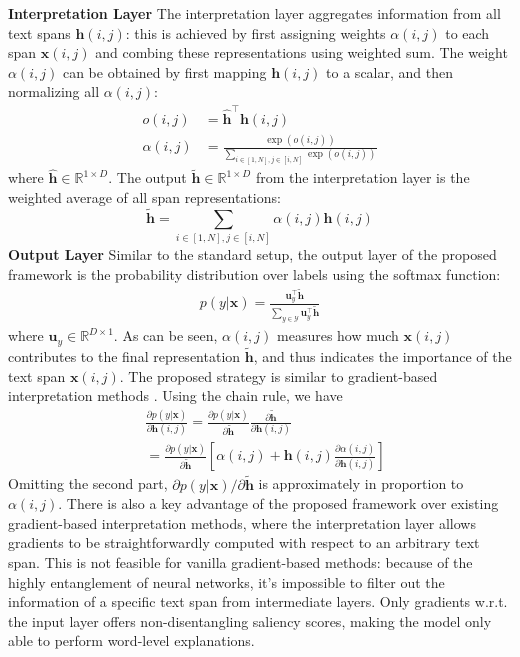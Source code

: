\documentclass[11pt,a4paper]{article}
\begin{document}
{\bf Interpretation Layer} The interpretation layer aggregates information from all text spans $\bm{h}(i,j)$:
this is achieved by first 
 assigning weights $\alpha(i,j)$ to each span $\bm{x}(i,j)$ and combing these representations using weighted sum. The weight $\alpha(i,j)$ 
 can be obtained by first mapping $\bm{h}(i,j)$ to a scalar, and then normalizing all $\alpha(i,j)$: 
\begin{equation}
\begin{aligned}
o(i,j)& = \hat{\bm{h}}^\top \bm{h}(i,j) \\
\alpha(i,j)&= \frac{\exp(o(i,j))}{\sum_{i\in [1,N], j\in [i,N]} \exp(o(i,j))}  
\end{aligned}
\end{equation}
where $\hat{\bm{h}}\in \mathbb{R}^{1\times D}$. The output $\tilde{\bm{h}}\in \mathbb{R}^{1\times D}$ from the  interpretation layer is the weighted average of all span representations:
\begin{equation}
  \tilde{\bm{h}} = \sum_{i\in [1,N], j\in [i,N]} \alpha(i,j) \bm{h}(i,j)
\end{equation}
{\bf Output Layer} Similar to the standard setup, the output layer of the proposed framework is the probability distribution over labels using the softmax function:
\begin{equation}
\begin{aligned}
p(y|\bm{x}) = \frac{\bm{u}_y^\top \tilde{\bm{h}}}{\sum_{y\in \mathcal{Y}}\bm{u}_y^\top \tilde{\bm{h}} }
\end{aligned}
\end{equation}
where $\bm{u}_y\in\mathbb{R}^{D\times 1}$. 
As can be seen, $\alpha(i,j)$ measures how much $\bm{x}(i,j)$ contributes to the final representation $\tilde{\bm{h}}$, and thus indicates 
 the importance of the text span $\bm{x}(i,j)$. The proposed strategy is similar to gradient-based interpretation methods \cite{simonyan2013deep,li2015visualizing}. Using the chain rule, we have 
 \begin{equation}
 \begin{aligned}
&\frac{\partial p(y|\bm{x})}{\partial \bm{h}(i,j)}  = \frac{\partial p(y|\bm{x})}{\partial \tilde{\bm{h}}} \frac{\partial{\tilde{\bm{h}}}}{\partial {\bm{h}(i,j)}} \\
& =  \frac{\partial p(y|\bm{x})}{\partial \tilde{\bm{h}}} \left[\alpha(i,j)+ \bm{h}(i,j)\frac{\partial{\alpha(i,j)}}{\partial \bm{h}(i,j)}\right]
\end{aligned}
 \end{equation}
Omitting the second part, ${\partial p(y|\bm{x})}/{\partial \tilde{\bm{h}}}$  is approximately in proportion to 
$\alpha(i,j)$.
There is also a key advantage of the proposed framework over existing gradient-based interpretation methods, where 
the interpretation layer allows 
gradients to be straightforwardly computed with respect to an arbitrary text span. This is not feasible for vanilla gradient-based methods: 
because of the highly entanglement of neural networks, it's impossible to filter out the information of a specific text span 
from intermediate layers. Only gradients w.r.t. the input layer offers non-disentangling saliency scores, making the model only able to perform word-level explanations. 
\end{document}
